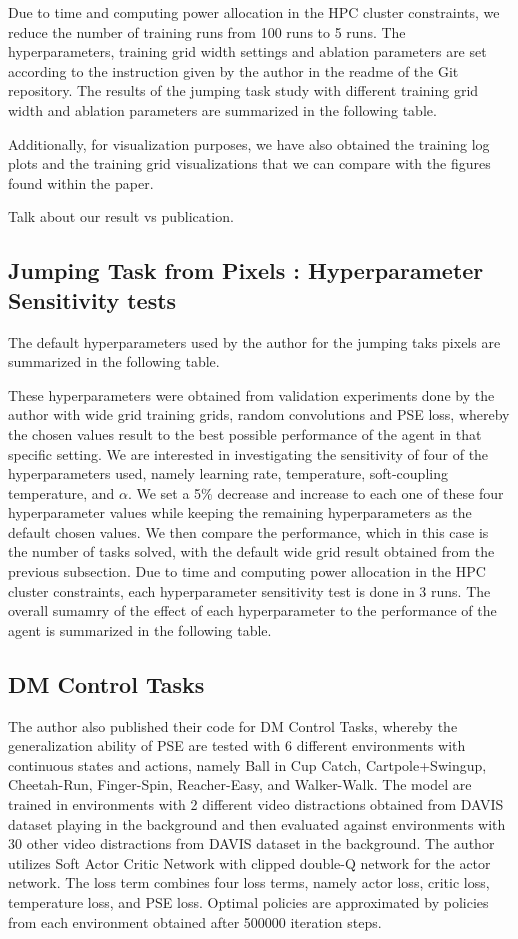 \documentclass{usiinftr}
\begin{document}
Due to time and computing power allocation in the HPC cluster constraints, we reduce the number of training runs from 100 runs to 5 runs. The hyperparameters, training grid width settings and ablation parameters are set according to the instruction given by the author in the readme of the Git repository. The results of the jumping task study with different training grid width and ablation parameters are summarized in the following table.


Additionally, for visualization purposes, we have also obtained the training log plots and the training grid visualizations that we can compare with the figures found within the paper.

Talk about our result vs publication.

\subsection{Jumping Task from Pixels : Hyperparameter Sensitivity tests}
The default hyperparameters used by the author for the jumping taks pixels are summarized in the following table. 

These hyperparameters were obtained from validation experiments done by the author with wide grid training grids, random convolutions and PSE loss, whereby the chosen values result to the best possible performance of the agent in that specific setting. We are interested in investigating the sensitivity of four of the hyperparameters used, namely learning rate, temperature, soft-coupling temperature, and $\alpha$. We set a 5\% decrease and increase to each one of these four hyperparameter values while keeping the remaining hyperparameters as the default chosen values. We then compare the performance, which in this case is the number of tasks solved, with the default wide grid result obtained from the previous subsection. Due to time and computing power allocation in the HPC cluster constraints, each hyperparameter sensitivity test is done in 3 runs. The overall sumamry of the effect of each hyperparameter to the performance of the agent is summarized in the following table.


\subsection{DM Control Tasks}
The author also published their code for DM Control Tasks, whereby the generalization ability of PSE are tested with 6 different environments with continuous states and actions, namely Ball in Cup Catch, Cartpole+Swingup, Cheetah-Run, Finger-Spin, Reacher-Easy, and Walker-Walk. The model are trained in environments with 2 different video distractions obtained from DAVIS dataset playing in the background and then evaluated against environments with 30 other video distractions from DAVIS dataset in the background. The author utilizes Soft Actor Critic Network with clipped double-Q network for the actor network. The loss term combines four loss terms, namely actor loss, critic loss, temperature loss, and PSE loss. Optimal policies are approximated by policies from each environment obtained after 500000 iteration steps. 
\end{document}
